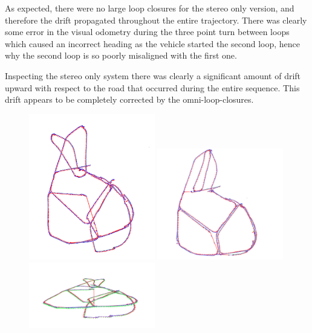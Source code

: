 As expected, there were no large loop closures for the stereo only version, and therefore the drift propagated throughout the entire trajectory.  There was clearly some error in the visual odometry during the three point turn between loops which caused an incorrect heading as the vehicle started the second loop, hence why the second loop is so poorly misaligned with the first one.

Inspecting the stereo only system there was clearly a significant amount of drift upward with respect to the road that occurred during the entire sequence.  This drift appears to be completely corrected by the omni-loop-closures.


\begin{figure}[h]
  \centering
    \includegraphics[width=0.49\textwidth]{chapters/images/stereo_above_carpark}
    \includegraphics[width=0.49\textwidth]{chapters/images/omni_above_carpark}\\
    \includegraphics[width=0.49\textwidth]{chapters/images/stereo_side_carpark}

\end{figure}

